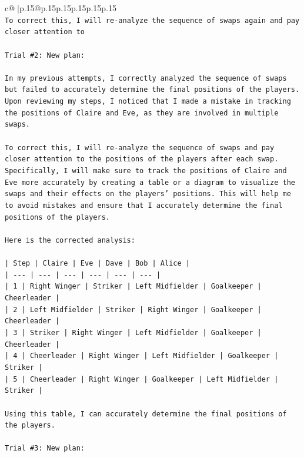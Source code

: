\documentclass{article}
\begin{document}
{\begin{supertabular}{c@{$\;$}|p{.15\linewidth}@{}p{.15\linewidth}p{.15\linewidth}p{.15\linewidth}p{.15\linewidth}p{.15\linewidth}}
{{{\\ 
\texttt{To correct this, I will re{-}analyze the sequence of swaps again and pay closer attention to} \\
\\ 
\texttt{Trial \#2: New plan: } \\
\\ 
\texttt{In my previous attempts, I correctly analyzed the sequence of swaps but failed to accurately determine the final positions of the players. Upon reviewing my steps, I noticed that I made a mistake in tracking the positions of Claire and Eve, as they are involved in multiple swaps. } \\
\\ 
\texttt{To correct this, I will re{-}analyze the sequence of swaps and pay closer attention to the positions of the players after each swap. Specifically, I will make sure to track the positions of Claire and Eve more accurately by creating a table or a diagram to visualize the swaps and their effects on the players' positions. This will help me to avoid mistakes and ensure that I accurately determine the final positions of the players. } \\
\\ 
\texttt{Here is the corrected analysis:} \\
\\ 
\texttt{| Step | Claire | Eve | Dave | Bob | Alice |} \\
\texttt{| {-}{-}{-} | {-}{-}{-} | {-}{-}{-} | {-}{-}{-} | {-}{-}{-} | {-}{-}{-} |} \\
\texttt{| 1    | Right Winger | Striker | Left Midfielder | Goalkeeper | Cheerleader |} \\
\texttt{| 2    | Left Midfielder | Striker | Right Winger | Goalkeeper | Cheerleader |} \\
\texttt{| 3    | Striker | Right Winger | Left Midfielder | Goalkeeper | Cheerleader |} \\
\texttt{| 4    | Cheerleader | Right Winger | Left Midfielder | Goalkeeper | Striker |} \\
\texttt{| 5    | Cheerleader | Right Winger | Goalkeeper | Left Midfielder | Striker |} \\
\\ 
\texttt{Using this table, I can accurately determine the final positions of the players.} \\
\\ 
\texttt{Trial \#3: New plan: } \\
\\ 
}}}
\end{supertabular}}
\end{document}
